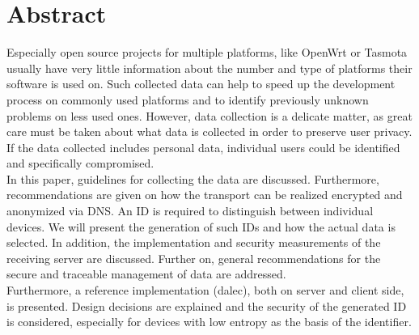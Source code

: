 \chapter*{Abstract}
\label{chap:abstract}

%
Especially open source projects for multiple platforms, like OpenWrt or Tasmota usually have very little information about the number and type of platforms their software is used on. Such collected data can help to speed up the development process on commonly used platforms and to identify previously unknown problems on less used ones. However, data collection is a delicate matter, as great care must be taken about what data is collected in order to preserve user privacy. If the data collected includes personal data, individual users could be identified and specifically compromised.\\

In this paper, guidelines for collecting the data are discussed. Furthermore, recommendations are given on how the transport can be realized encrypted and anonymized via DNS. An ID is required to distinguish between individual devices. We will present the generation of such IDs and how the actual data is selected. In addition, the implementation and security measurements of the receiving server are discussed. Further on, general recommendations for the secure and traceable management of data are addressed.\\

Furthermore, a reference implementation (dalec), both on server and client side, is presented. Design decisions are explained and the security of the generated ID is considered, especially for devices with low entropy as the basis of the identifier.